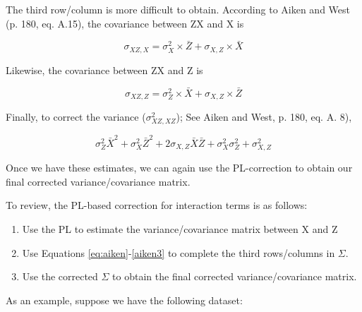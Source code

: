 \documentclass[doc, babel,english]{apa}%
\begin{document}
The third row/column is more difficult to obtain. According to Aiken and West (p. 180, eq. A.15), the covariance between ZX and X is

\begin{equation}
\sigma_{XZ,X} = \sigma^2_X \times \bar{Z} + \sigma_{X,Z}\times\bar{X}
\end{equation}
\label{eq:aiken}

Likewise, the covariance between ZX and Z is

\begin{equation}
\sigma_{XZ,Z} = \sigma^2_Z \times \bar{X} + \sigma_{X,Z}\times\bar{Z}
\end{equation}
\label{eq:aiken2}

Finally, to correct the variance ($\sigma^2_{XZ,XZ}$); See Aiken and West, p. 180, eq. A. 8),

\begin{equation}
\sigma^2_Z\bar{X}^2 + \sigma^2_X\bar{Z}^2 + 2\sigma_{X,Z}\bar{X}\bar{Z} + \sigma^2_X\sigma^2_Z + \sigma^2_{X,Z}
\end{equation}
\label{eq:aiken3}

Once we have these estimates, we can again use the PL-correction to obtain our final corrected variance/covariance matrix. 

To review, the PL-based correction for interaction terms is as follows:

\begin{enumerate}
\item Use the PL to estimate the variance/covariance matrix between X and Z
\item Use Equations \ref{eq:aiken}-\ref{aiken3} to complete the third rows/columns in $\Sigma$.
\item Use the corrected $\Sigma$ to obtain the final corrected variance/covariance matrix. 
\end{enumerate}

As an example, suppose we have the following dataset: 
\end{document}
